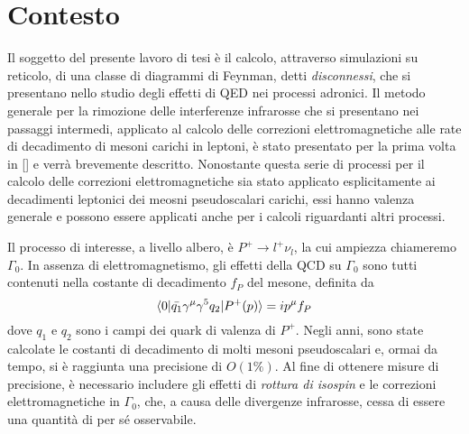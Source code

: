 \documentclass[LaM]{sapthesis}
\begin{document}
	\chapter{Contesto}
	Il soggetto del presente lavoro di tesi è il calcolo, attraverso simulazioni su reticolo, di una classe di diagrammi di Feynman, detti \emph{disconnessi}, che si presentano nello studio degli effetti di QED nei processi adronici. Il metodo generale per la rimozione delle interferenze infrarosse che si presentano nei passaggi intermedi, applicato al calcolo delle correzioni elettromagnetiche alle rate di decadimento di mesoni carichi in leptoni, è stato presentato per la prima volta in [\color{green}{articolo QED Corrections to Hadronic Processes in Lattice QCD}\color{black}] e verrà brevemente descritto. Nonostante questa serie di processi per il calcolo delle correzioni elettromagnetiche sia stato applicato esplicitamente ai decadimenti leptonici dei meosni pseudoscalari carichi, essi hanno valenza generale e possono essere applicati anche per i calcoli riguardanti altri processi.
	
	Il processo di interesse, a livello albero, è $P^+\to l^+\nu_l$, la cui ampiezza chiameremo $\Gamma_0$. In assenza di elettromagnetismo, gli effetti della QCD su $\Gamma_0$ sono tutti contenuti nella costante di decadimento $f_P$ del mesone, definita da
	\begin{equation}
	\braket{0|\bar{q_1}\gamma^\mu\gamma^5q_2|P^+(p)}=ip^\mu f_P
	\end{equation}
	dove $q_1$ e $q_2$ sono i campi dei quark di valenza di $P^+$. Negli anni, sono state calcolate le costanti di decadimento di molti mesoni pseudoscalari e, ormai da tempo, 
	si è raggiunta una precisione di $O(1\%)$. Al fine di ottenere misure di precisione, è necessario includere gli effetti di \emph{rottura di isospin} e le correzioni elettromagnetiche in $\Gamma_0$, che, a causa delle divergenze infrarosse, cessa di essere una quantità di per sé osservabile.
	
\end{document}

